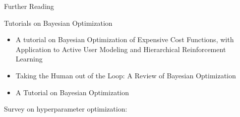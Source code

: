 \subtitle{Further Reading}

\maketitle

\begin{frame}[c]{Further Reading}

Tutorials on Bayesian Optimization
\begin{itemize}
    \item A tutorial on Bayesian Optimization of Expensive Cost Functions, with Application to Active User Modeling and Hierarchical Reinforcement Learning 
    \item Taking the Human out of the Loop: A Review of Bayesian Optimization 
    \item A Tutorial on Bayesian Optimization 
\end{itemize}

\bigskip

Survey on hyperparameter optimization:     

\end{frame}
